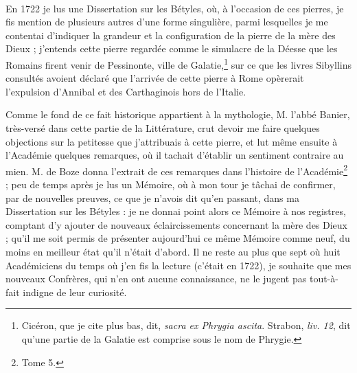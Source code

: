 \documentclass[a4paper, 11pt, oneside, polutonikogreek, french]{article}
\begin{document}
\paragraph{}
En 1722 je lus une Dissertation sur les Bétyles, où, à l'occasion de ces pierres, je fis mention de plusieurs autres d'une forme singulière, parmi lesquelles je me contentai d'indiquer la grandeur et la configuration de la pierre de la mère des Dieux ; j'entends cette pierre regardée comme le simulacre de la Déesse que les Romains firent venir de Pessinonte, ville de Galatie,\footnote{Cicéron, que je cite plus bas, dit, \emph{sacra ex Phrygia ascita}. Strabon, \emph{liv. 12}, dit qu'une partie de la Galatie est comprise sous le nom de Phrygie.} sur ce que les livres Sibyllins consultés avoient déclaré que l'arrivée de cette pierre à Rome opèrerait l'expulsion d'Annibal et des Carthaginois hors de l'Italie.

Comme le fond de ce fait historique appartient à la mythologie, M. l'abbé Banier, très-versé dans cette partie de la Littérature, crut devoir me faire quelques objections sur la petitesse que j'attribuais à cette pierre, et lut même ensuite à l'Académie quelques remarques, où il tachait d'établir un sentiment contraire au mien. M. de Boze donna l'extrait de ces remarques dans l'histoire de l'Académie\footnote{Tome 5.} ; peu de temps après je lus un Mémoire, où à mon tour je tâchai de confirmer, par de nouvelles preuves, ce que je n'avois dit qu'en passant, dans ma Dissertation sur les Bétyles : je ne donnai point alors ce Mémoire à nos registres, comptant d'y ajouter de nouveaux éclaircissements concernant la mère des Dieux ; qu'il me soit permis de présenter aujourd'hui ce même Mémoire comme neuf, du moins en meilleur état qu'il n'était d'abord. Il ne reste au plus que sept où huit Académiciens du temps où j'en fis la lecture (c'était en 1722), je souhaite que mes nouveaux Confrères, qui n'en ont aucune connaissance, ne le jugent pas tout-à-fait indigne de leur curiosité.
\end{document}
